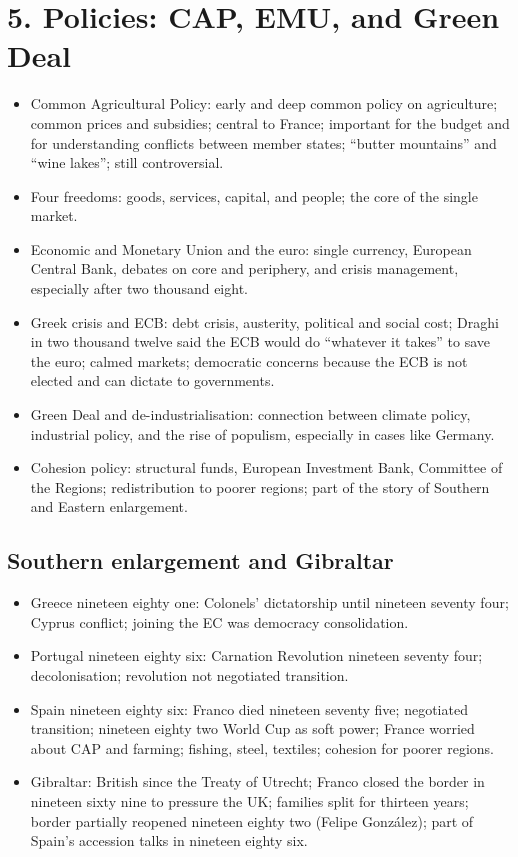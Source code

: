\documentclass[10pt,a4paper]{article}
\begin{document}
\section*{5. Policies: CAP, EMU, and Green Deal}
\begin{itemize}
\item Common Agricultural Policy: early and deep common policy on agriculture; common prices and subsidies; central to France; important for the budget and for understanding conflicts between member states; ``butter mountains'' and ``wine lakes''; still controversial.
\item Four freedoms: goods, services, capital, and people; the core of the single market.
\item Economic and Monetary Union and the euro: single currency, European Central Bank, debates on core and periphery, and crisis management, especially after two thousand eight.
\item Greek crisis and ECB: debt crisis, austerity, political and social cost; Draghi in two thousand twelve said the ECB would do ``whatever it takes'' to save the euro; calmed markets; democratic concerns because the ECB is not elected and can dictate to governments.
\item Green Deal and de-industrialisation: connection between climate policy, industrial policy, and the rise of populism, especially in cases like Germany.
\item Cohesion policy: structural funds, European Investment Bank, Committee of the Regions; redistribution to poorer regions; part of the story of Southern and Eastern enlargement.
\end{itemize}

\subsection*{Southern enlargement and Gibraltar}
\begin{itemize}
\item Greece nineteen eighty one: Colonels' dictatorship until nineteen seventy four; Cyprus conflict; joining the EC was democracy consolidation.
\item Portugal nineteen eighty six: Carnation Revolution nineteen seventy four; decolonisation; revolution not negotiated transition.
\item Spain nineteen eighty six: Franco died nineteen seventy five; negotiated transition; nineteen eighty two World Cup as soft power; France worried about CAP and farming; fishing, steel, textiles; cohesion for poorer regions.
\item Gibraltar: British since the Treaty of Utrecht; Franco closed the border in nineteen sixty nine to pressure the UK; families split for thirteen years; border partially reopened nineteen eighty two (Felipe González); part of Spain's accession talks in nineteen eighty six.
\end{itemize}
\end{document}
